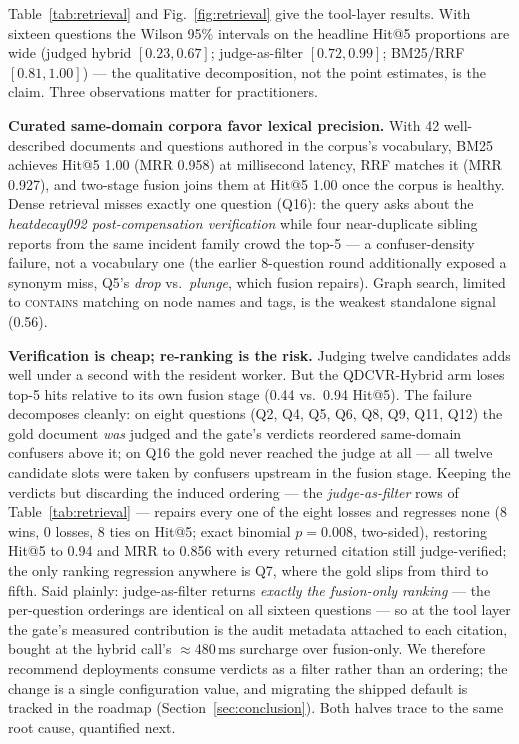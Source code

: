 Table~\ref{tab:retrieval} and Fig.~\ref{fig:retrieval} give the tool-layer
results. With sixteen questions the Wilson 95\% intervals on the headline
Hit@5 proportions are wide (judged hybrid $[0.23, 0.67]$; judge-as-filter
$[0.72, 0.99]$; BM25/RRF $[0.81, 1.00]$) --- the qualitative decomposition,
not the point estimates, is the claim. Three observations matter for
practitioners.

\textbf{Curated same-domain corpora favor lexical precision.} With 42
well-described documents and questions authored in the corpus's vocabulary,
BM25 achieves Hit@5 1.00 (MRR 0.958) at millisecond latency, RRF matches it
(MRR 0.927), and two-stage fusion joins them at Hit@5 1.00 once the
corpus is healthy. Dense retrieval misses exactly one question (Q16): the
query asks about the \emph{heatdecay092 post-compensation verification}
while four near-duplicate sibling reports from the same incident family
crowd the top-5 --- a confuser-density failure, not a vocabulary one (the
earlier 8-question round additionally exposed a synonym miss, Q5's
\emph{drop} vs.\ \emph{plunge}, which fusion repairs). Graph search,
limited to \textsc{contains} matching on node names and tags, is the
weakest standalone signal (0.56).

\textbf{Verification is cheap; re-ranking is the risk.} Judging twelve
candidates adds well under a second with the resident worker. But the
QDCVR-Hybrid arm loses top-5 hits relative to its own fusion stage
(0.44 vs.\ 0.94 Hit@5). The failure decomposes cleanly: on eight questions
(Q2, Q4, Q5, Q6, Q8, Q9, Q11, Q12) the gold document \emph{was} judged and
the gate's verdicts reordered same-domain confusers above it; on Q16 the
gold never reached the judge at all --- all twelve candidate slots were
taken by confusers upstream in the fusion stage. Keeping the verdicts but
discarding the induced ordering --- the \emph{judge-as-filter} rows of
Table~\ref{tab:retrieval} --- repairs every one of the eight losses and
regresses none (8 wins, 0 losses, 8 ties on Hit@5; exact binomial
$p = 0.008$, two-sided), restoring Hit@5 to 0.94 and MRR to 0.856 with
every returned citation still judge-verified; the only ranking regression
anywhere is Q7, where the gold slips from third to fifth. Said plainly:
judge-as-filter returns \emph{exactly the fusion-only ranking} --- the
per-question orderings are identical on all sixteen questions --- so at
the tool layer the gate's measured contribution is the audit metadata
attached to each citation, bought at the hybrid call's $\approx$480\,ms
surcharge over fusion-only. We therefore recommend deployments consume
verdicts as a filter rather than an ordering; the change is a single
configuration value, and migrating the shipped default is tracked in the
roadmap (Section~\ref{sec:conclusion}). Both halves
trace to the same root cause, quantified next.

